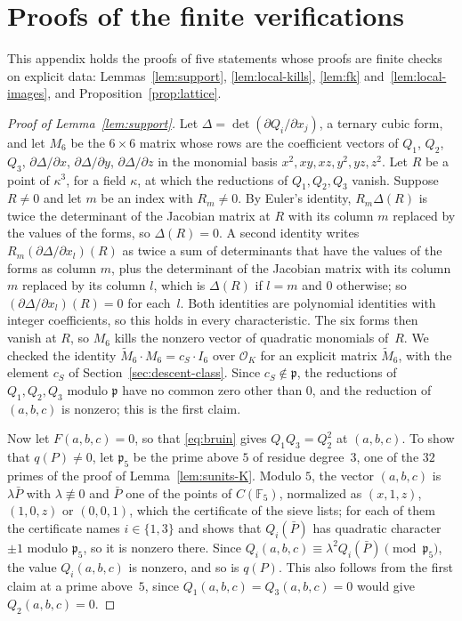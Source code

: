 \documentclass[11pt]{amsart}
\theoremstyle{definition}
\numberwithin{equation}{section}
\newcommand{\F}{\mathbb{F}}
\newcommand{\OK}{\mathcal{O}_K}
\begin{document}
\appendix
\section{Proofs of the finite verifications}\label{app:checks}

This appendix holds the proofs of five statements whose proofs are finite checks on explicit data: Lemmas~\ref{lem:support}, \ref{lem:local-kills}, \ref{lem:fk} and~\ref{lem:local-images}, and Proposition~\ref{prop:lattice}.

\begin{proof}[Proof of Lemma~\ref{lem:support}]
Let $\Delta=\det(\partial Q_i/\partial x_j)$, a ternary cubic form, and let $M_6$ be the $6\times6$ matrix whose rows are the coefficient vectors of $Q_1$, $Q_2$, $Q_3$, $\partial\Delta/\partial x$, $\partial\Delta/\partial y$, $\partial\Delta/\partial z$ in the monomial basis $x^2,xy,xz,y^2,yz,z^2$. Let $R$ be a point of $\kappa^3$, for a field $\kappa$, at which the reductions of $Q_1,Q_2,Q_3$ vanish. Suppose $R\neq0$ and let $m$ be an index with $R_m\neq0$. By Euler's identity, $R_m\Delta(R)$ is twice the determinant of the Jacobian matrix at $R$ with its column $m$ replaced by the values of the forms, so $\Delta(R)=0$. A second identity writes $R_m(\partial\Delta/\partial x_l)(R)$ as twice a sum of determinants that have the values of the forms as column $m$, plus the determinant of the Jacobian matrix with its column $m$ replaced by its column $l$, which is $\Delta(R)$ if $l=m$ and $0$ otherwise; so $(\partial\Delta/\partial x_l)(R)=0$ for each~$l$. Both identities are polynomial identities with integer coefficients, so this holds in every characteristic. The six forms then vanish at $R$, so $M_6$ kills the nonzero vector of quadratic monomials of~$R$. We checked the identity $\tilde M_6\cdot M_6=c_S\cdot I_6$ over $\OK$ for an explicit matrix $\tilde M_6$, with the element $c_S$ of Section~\ref{sec:descent-class}. Since $c_S\notin\mathfrak p$, the reductions of $Q_1,Q_2,Q_3$ modulo $\mathfrak p$ have no common zero other than $0$, and the reduction of $(a,b,c)$ is nonzero; this is the first claim.

Now let $F(a,b,c)=0$, so that \eqref{eq:bruin} gives $Q_1Q_3=Q_2^2$ at $(a,b,c)$. To show that $q(P)\neq0$, let $\mathfrak p_5$ be the prime above $5$ of residue degree~$3$, one of the $32$ primes of the proof of Lemma~\ref{lem:sunits-K}. Modulo $5$, the vector $(a,b,c)$ is $\lambda\bar P$ with $\lambda\not\equiv0$ and $\bar P$ one of the points of $C(\F_5)$, normalized as $(x,1,z)$, $(1,0,z)$ or $(0,0,1)$, which the certificate of the sieve lists; for each of them the certificate names $i\in\{1,3\}$ and shows that $Q_i(\bar P)$ has quadratic character $\pm1$ modulo $\mathfrak p_5$, so it is nonzero there. Since $Q_i(a,b,c)\equiv\lambda^2Q_i(\bar P)\pmod{\mathfrak p_5}$, the value $Q_i(a,b,c)$ is nonzero, and so is $q(P)$. This also follows from the first claim at a prime above~$5$, since $Q_1(a,b,c)=Q_3(a,b,c)=0$ would give $Q_2(a,b,c)=0$.


\end{proof}
\end{document}
